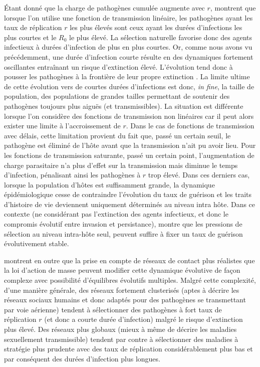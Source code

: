 Étant donné que la charge de pathogènes cumulée augmente avec $r$,
\citet{King2009} montrent que lorsque l'on utilise une fonction de
transmission linéaire, les pathogènes ayant les taux de réplication
$r$ les plus élevés sont ceux ayant les durées d'infections les plus
courtes et le $R_0$ le plus élevé. La sélection naturelle favorise
donc des agents infectieux à durées d'infection de plus en plus
courtes. Or, comme nous avons vu précédemment, une durée d'infection
courte résulte en des dynamiques fortement oscillantes entraînant un
risque d'extinction élevé. L'évolution tend donc à pousser les
pathogènes à la frontière de leur propre extinction \citep{Rand1995}.
La limite ultime de cette évolution vers de courtes durées
d'infections est donc, \textit{in fine}, la taille de population, des
populations de grandes tailles permettant de soutenir des pathogènes
toujours plus aiguës (et transmissibles). La situation est différente
lorsque l'on considère des fonctions de transmission non linéaires car
il peut alors exister une limite à l'accroissement de $r$. Dans le cas
de fonctions de transmission avec délais, cette limitation provient du
fait que, passé un certain seuil, le pathogène est éliminé de l'hôte
avant que la transmission n'ait pu avoir lieu. Pour les fonctions de
transmission saturante, passé un certain point, l'augmentation de
charge parasitaire n'a plus d'effet sur la transmission mais diminue
le temps d'infection, pénalisant ainsi les pathogènes à $r$ trop
élevé. Dans ces derniers cas, lorsque la population d'hôtes est
suffisamment grande, la dynamique épidémiologique cesse de contraindre
l'évolution du taux de guérison et les traits d'histoire de vie
deviennent uniquement déterminés au niveau intra hôte.
%
Dans ce contexte (ne considérant pas l'extinction des agents
infectieux, et donc le compromis évolutif entre invasion et
persistance), \citet{Alizon2008} montre que les pressions de sélection
au niveau intra-hôte seul, peuvent suffire à fixer un taux de guérison
évolutivement stable.

\citet{Read2006} montrent en outre que la prise en compte de réseaux
de contact plus réalistes que la loi d'action de masse peuvent
modifier cette dynamique évolutive de façon complexe avec possibilité
d'équilibres évolutifs multiples. Malgré cette complexité, d'une
manière générale, des réseaux fortement clusterisés (aptes à décrire
les réseaux sociaux humains et donc adaptés pour des pathogènes se
transmettant par voie aérienne) tendent à sélectionner des pathogènes
à fort taux de réplication $r$ (et donc a courte durée d'infection)
malgré le risque d'extinction plus élevé. Des réseaux plus globaux
(mieux à même de décrire les maladies sexuellement transmissible)
tendent par contre à sélectionner des maladies à stratégie plus
prudente avec des taux de réplication considérablement plus bas et par
conséquent des durées d'infection plus longues.

